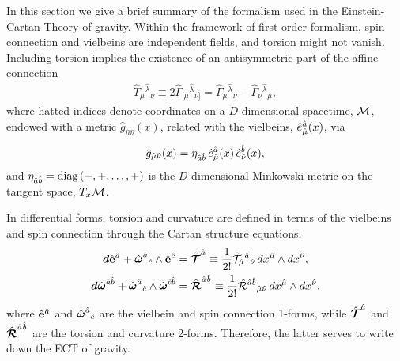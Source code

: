 \documentclass[twocolumn,showpacs,showkeys,prd,superscriptaddress]{revtex4-1}
\begin{document}
In this section we give a brief summary of the formalism used in the Einstein-Cartan Theory of gravity. %
Within the framework of first order formalism, spin connection and vielbeins are independent fields, and  torsion might not vanish. Including torsion implies the existence of an antisymmetric part of the affine connection
\begin{align}
  \hat{T}_{\hat{\mu}}{}^{\hat{\lambda}}{}_{\hat{\nu}} \equiv 2\hat{\Gamma}_{[\hat{\mu}}{}^{\hat{\lambda}}{}_{\hat{\nu}]} = \hat{\Gamma}_{\hat{\mu}}{}^{\hat{\lambda}}{}_{\hat{\nu}} - \hat{\Gamma}_{\hat{\nu}}{}^{\hat{\lambda}}{}_{\hat{\mu}},
\end{align}
where hatted  indices denote coordinates on a $D$-dimensional  spacetime, $\mathcal{M}$, endowed with a metric $\hat{g}_{\hat{\mu}\hat{\nu}}(x)$,  related with the vielbeins, $\hat{e}^{\hat{a}}_{\hat{\mu}}(x)$, via
\begin{equation}
  \label{metricrelation}
  \hat{g}_{\hat{\mu}\hat{\nu}}(x) = {\eta}_{\hat{a}\hat{b}}\,\hat{e}^{\hat{a}}_{\hat{\mu}}(x)\,\hat{e}^{\hat{b}}_{\hat{\nu}}(x),
\end{equation}
and ${\eta}_{\hat{a}\hat{b}} = \operatorname{diag}{\left(-,+,\ldots,+\right)}$ is the $D$-dimensional Minkowski metric on the tangent space, $T_x\mathcal{M}$.

In  differential forms,  torsion and curvature are defined in terms of the vielbeins and spin connection through the Cartan structure equations,
\begin{align}
  \label{cartantorsion}
  {\boldsymbol{d}}\hat{{\bf{e}}}^{\hat{a}_{}} + \hat{{\boldsymbol{\omega}}}^{\hat{a}}{}_{\hat{c}}\wedge\hat{{\bf{e}}}^{\hat{c}_{}} &= \hat{{\boldsymbol{\mathcal{T}}}}^{\hat{a}_{}} \equiv \frac{1}{2!}\hat{\mathcal{T}}_{\hat{\mu}}{}^{\hat{a}}{}_{\hat{\nu}}\,dx^{\hat{\mu}}\wedge dx^{\hat{\nu}}, \\
  \label{cartancurvature}
  {\boldsymbol{d}}\hat{{\boldsymbol{\omega}}}^{\hat{a}\hat{b}} + \hat{{\boldsymbol{\omega}}}^{\hat{a}}{}_{\hat{c}}\wedge\hat{{\boldsymbol{\omega}}}^{\hat{c}\hat{b}} &= \hat{{\boldsymbol{\mathcal{R}}}}^{\hat{a}_{}\hat{b}_{}} \equiv \frac{1}{2!}\hat{{\mathcal{R}}}^{\hat{a}\hat{b}}{}_{\hat{\mu}\hat{\nu}}\,dx^{\hat{\mu}}\wedge dx^{\hat{\nu}},
\end{align}
where $\hat{{\bf{e}}}^{\hat{a}_{}}$ and $\hat{{\boldsymbol{\omega}}}^{\hat{a}}{}_{\hat{c}}$ are the vielbein and spin connection 1-forms, while $\hat{{\boldsymbol{\mathcal{T}}}}^{\hat{a}_{}}$ and $\hat{{\boldsymbol{\mathcal{R}}}}^{\hat{a}_{}\hat{b}_{}}$ are the  torsion and curvature 2-forms. Therefore, the latter serves to write down the ECT of gravity.
\end{document}
